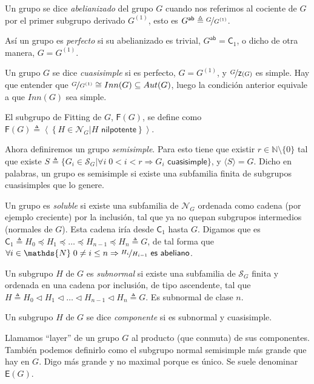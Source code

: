 \documentclass[12pt,a4paper,fleqn,spanish,final,openright]{extbook}
\theoremstyle{definition}
\theoremstyle{remark}
\begin{document}
Un grupo se dice \emph{abelianizado} del grupo $G$ cuando nos referimos al cociente 
de $G$ por el primer subgrupo derivado $G^{(1)}$, esto es 
$G^{\textsf{ab}}\triangleq \nicefrac{G}{G^{(1)}}$.

Así un grupo es \emph{perfecto} si su abelianizado es trivial, 
$G^{\textsf{ab}} = \mathsf{C}_1$, o dicho de otra manera, 
$G = G^{(1)}$.

Un grupo $G$ se dice \emph{cuasisimple} si es perfecto, $G = G^{(1)}$, y 
$\nicefrac{G}{\mathsf{Z}(G)}$ es simple. Hay que entender que 
$\nicefrac{G}{G^{(1)}} \cong Inn(G) \subseteq Aut(G)$, luego la condición 
anterior equivale a que $Inn(G)$ sea simple.

El subgrupo de Fitting de $G$, $\mathsf{F}(G)$, se define como 
$\mathsf{F}(G) \triangleq \left\langle{\left\lbrace{H \in \mathcal{N}_G \vert 
H \textsf{ nilpotente}}\right\rbrace}\right\rangle$.

Ahora definiremos un grupo \emph{semisimple}. Para esto tiene que existir 
$r \in \mathds{N}\setminus\lbrace 0 \rbrace$ tal que existe 
$S\triangleq \lbrace{G_i \in \mathcal{S}_G \vert 
\forall i\; 0<i<r \Rightarrow G_i \textsf{ cuasisimple}}\rbrace$, 
y $\langle S \rangle = G$. Dicho en palabras, un grupo es semisimple si existe 
una subfamilia finita de subgrupos cuasisimples que lo genere.

Un grupo es \emph{soluble} si existe una subfamilia de $\mathcal{N}_G$ ordenada 
como cadena (por ejemplo creciente) por la inclusión, tal que ya no quepan 
subgrupos intermedios (normales de $G$). Esta cadena iría desde 
$\mathsf{C}_{1}$ hasta $G$. Digamos que es 
$\mathsf{C}_{1}\triangleq H_0 \preccurlyeq H_1 \preccurlyeq \ldots 
\preccurlyeq H_{n-1} \preccurlyeq H_n \triangleq G$, de tal forma que 
$\forall i \in \mathds{N}\;0 \neq i\leq n \Rightarrow 
\nicefrac{H_i}{H_{i-1}} \textsf{ es abeliano}$.

Un subgrupo $H$ de $G$ es \emph{subnormal} si existe una subfamilia de $\mathcal{S}_{G}$ 
finita y ordenada en una cadena por inclusión, de tipo ascendente, tal que 
$H\triangleq H_0 \lhd H_1 \lhd \ldots \lhd H_{n-1} \lhd H_n \triangleq G$. 
Es subnormal de clase $n$.

Un subgrupo $H$ de $G$ se dice \emph{componente} si es subnormal y cuasisimple.

Llamamos ``layer'' de un grupo $G$ al producto (que conmuta) de sus componentes. 
También podemos definirlo como el subgrupo normal semisimple más grande que hay en $G$. 
Digo más grande y no maximal porque es único. Se suele denominar $\mathsf{E}(G)$.
\end{document}
